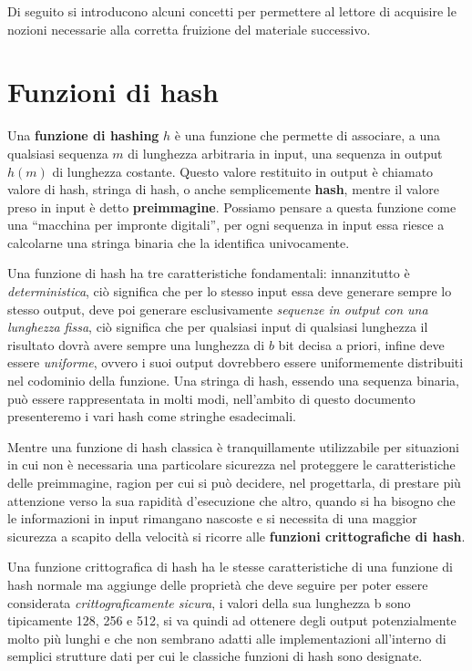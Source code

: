Di seguito si introducono alcuni concetti 
per permettere al lettore di acquisire le nozioni necessarie alla
corretta fruizione del materiale successivo.

\section{Funzioni di hash}
\label{sub:hash}
Una \textbf{funzione di hashing} \(h\) è una funzione che permette di associare,
a una qualsiasi sequenza \(m\) di lunghezza arbitraria in input, una sequenza
in output \(h(m)\) di lunghezza costante. 
Questo valore restituito in output è chiamato valore di hash, stringa di hash,
o anche semplicemente \textbf{hash}, mentre il valore preso in input è detto
\textbf{preimmagine}. Possiamo pensare a questa funzione come una “macchina per
impronte digitali”, per ogni sequenza in input essa riesce a calcolarne una stringa binaria
che la identifica univocamente.

Una funzione di hash ha tre caratteristiche fondamentali:
innanzitutto è \emph{deterministica}, ciò significa che per lo stesso input essa deve
generare sempre lo stesso output, deve poi generare esclusivamente
\emph{sequenze in output con una lunghezza fissa}, ciò significa che per qualsiasi input
di qualsiasi lunghezza il risultato dovrà avere sempre una lunghezza di \(b\) bit decisa
a priori, infine deve essere \emph{uniforme}, ovvero i suoi output dovrebbero essere
uniformemente distribuiti nel codominio della funzione.
Una stringa di hash, essendo una sequenza binaria, può essere rappresentata in molti modi,
nell’ambito di questo documento presenteremo i vari hash come stringhe esadecimali.

Mentre una funzione di hash classica è tranquillamente utilizzabile per situazioni
in cui non è necessaria una particolare sicurezza nel proteggere le caratteristiche
delle preimmagine, ragion per cui si può decidere, nel progettarla, di prestare più
attenzione verso la sua rapidità d’esecuzione che altro, quando si ha bisogno che le
informazioni in input rimangano nascoste e si necessita di una maggior sicurezza a scapito
della velocità si ricorre alle \textbf{funzioni crittografiche di hash}.

Una funzione crittografica di hash ha le stesse caratteristiche di una funzione di
hash normale ma aggiunge delle proprietà che deve seguire per poter essere considerata
\emph{crittograficamente sicura}, i valori della sua lunghezza b sono tipicamente
128, 256 e 512, si va quindi ad ottenere degli output potenzialmente molto più lunghi
e che non sembrano adatti alle implementazioni all’interno di semplici strutture dati
per cui le classiche funzioni di hash sono designate.

